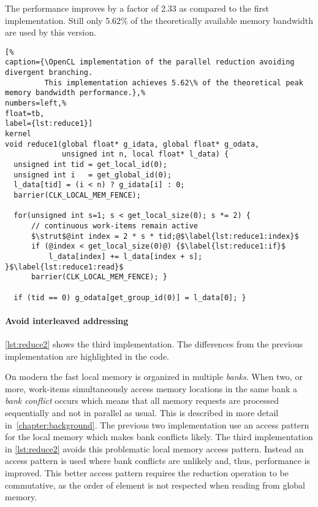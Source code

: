 The performance improves by a factor of 2.33 as compared to the first implementation.
Still only 5.62\% of the theoretically available memory bandwidth are used by this version.

\begin{lstlisting}[%                                                             
caption={\OpenCL implementation of the parallel reduction avoiding divergent branching.
         This implementation achieves 5.62\% of the theoretical peak memory bandwidth performance.},%
numbers=left,%
float=tb,
label={lst:reduce1}]
kernel
void reduce1(global float* g_idata, global float* g_odata,
             unsigned int n, local float* l_data) {
  unsigned int tid = get_local_id(0);
  unsigned int i   = get_global_id(0);
  l_data[tid] = (i < n) ? g_idata[i] : 0;
  barrier(CLK_LOCAL_MEM_FENCE);

  for(unsigned int s=1; s < get_local_size(0); s *= 2) {
      // continuous work-items remain active
      $\strut$@int index = 2 * s * tid;@$\label{lst:reduce1:index}$
      if (@index < get_local_size(0)@) {$\label{lst:reduce1:if}$
          l_data[index] += l_data[index + s]; }$\label{lst:reduce1:read}$
      barrier(CLK_LOCAL_MEM_FENCE); }

  if (tid == 0) g_odata[get_group_id(0)] = l_data[0]; }
\end{lstlisting}


\paragraph{Avoid interleaved addressing}

\autoref{lst:reduce2} shows the third implementation.
The differences from the previous implementation are highlighted in the code.

On modern \GPUs the fast local memory is organized in multiple \emph{banks}.
When two, or more, work-items simultaneously access memory locations in the same bank a \emph{bank conflict} occurs which means that all memory requests are processed sequentially and not in parallel as usual.
This is described in more detail in~\autoref{chapter:background}.
The previous two implementation use an access pattern for the local memory which makes bank conflicts likely.
The third implementation in \autoref{lst:reduce2} avoids this problematic local memory access pattern.
Instead an access pattern is used where bank conflicts are unlikely and, thus, performance is improved.
This better access pattern requires the reduction operation to be commutative, as the order of element is not respected when reading from global memory.

